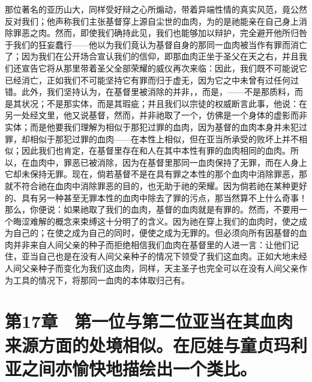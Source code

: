 那位著名的亚历山大，同样受好辩之心所煽动，带着异端性情的真实风范，竟公然反对我们；他声称我们主张基督穿上源自尘世的血肉，为的是祂能亲在自己身上消除罪恶之肉。然而，即使我们确持此见，我们也能够加以辩护，完全避开他所归咎于我们的狂妄蠢行——他以为我们竟认为基督自身的那同一血肉被当作有罪而消亡了；因为我们在公开场合宣认我们的信仰，即那血肉正坐于圣父在天之右，并且我们还宣告它将从那里带着圣父全部荣耀的威仪再次来临：因此，我们既不可能说它已经消亡，正如我们不可能坚持它有罪而归于虚无，因为它之中未曾有过任何过错。此外，我们坚持认为，在基督里被消除的并非，，而是，——不是那质料，而是其状况；不是那实体，而是其瑕疵；并且我们以宗徒的权威断言此事，他说：在另一处经文里，他又说基督，然而，并非祂取了一个，仿佛是一个身体的虚影而非实体；而是他要我们理解为相似于那犯过罪的血肉，因为基督的血肉本身并未犯过罪，却相似于那犯过罪的血肉——在本性上相似，但在亚当所承受的败坏上并不相似；因此我们也肯定，在基督里存在和人在其中本性有罪的血肉相同的血肉。所以，在血肉中，罪恶已被消除，因为在基督里那同一血肉保持了无罪，而在人身上它却未保持无罪。现在，倘若基督不是在具有罪之本性的那个血肉中消除罪恶，那就不符合祂在血肉中消除罪恶的目的，也无助于祂的荣耀。因为倘若祂在某种更好的、具有另一种甚至无罪本性的血肉中除去了罪的污点，那当然算不上什么奇事！那么，你便说：如果祂取了我们的血肉，基督的血肉就是有罪的。然而，不要用一个晦涩难解的概念来束缚这十分明了的含义。因为祂在穿上我们的血肉时，使之成为自己的；在使之成为自己的同时，便使之成为无罪的。但必须向所有因基督的血肉并非来自人间父亲的种子而拒绝相信我们血肉在基督里的人进一言：让他们记住，亚当自己也是在没有人间父亲种子的情况下领受了我们这血肉。正如大地未经人间父亲种子而变化为我们这血肉，同样，天主圣子也完全可以在没有人间父亲作为工具的情况下，将那同一血肉的本体取归己有。\par


\section{第17章　第一位与第二位亚当在其血肉来源方面的处境相似。在厄娃与童贞玛利亚之间亦愉快地描绘出一个类比。}

